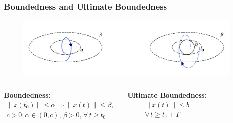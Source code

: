 \documentclass[student, noshadow, lsr, english, aspectratio=169, t]{ITR_LSR_slides}
\begin{document}
\begin{frame}
	\frametitle{Boundedness and Ultimate Boundedness}
	\begin{figure}
		\centering
		\includegraphics[width=\textwidth]{ultimate_boundedness_rotated.pdf}
		\caption{}
		\label{fig:boundedness_vs_ultimate_boundedness}
	\end{figure}
	\vspace{-1cm}
	\begin{columns}[t,totalwidth=\textwidth]
		\textbf{Boundedness:}
		\begin{align*}
			\|\underline{x}(t_0)\| \leq \alpha \Rightarrow \|\underline{x}(t)\| \leq \beta,
			\\ c>0, \alpha\in(0,c),\, \beta>0,\,\forall\, t \geq t_0
		\end{align*}

		\textbf{Ultimate Boundedness:}
		\begin{align*}
			\|\underline{x}(t)\| \leq b 
			\\ \forall\, t \geq t_0+T
		\end{align*}
    \end{columns}
\end{frame}


\end{document}
